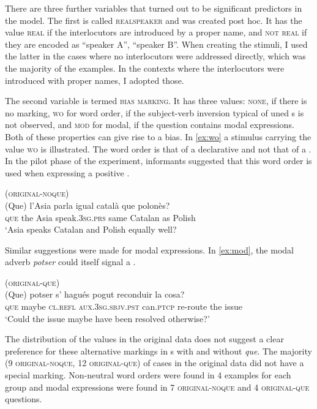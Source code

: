 There are three further variables that turned out to be significant predictors in the model. The first  is called \textsc{realspeaker} and  was created post hoc. It has the value \textsc{real} if the interlocutors are introduced by a proper name, and \textsc{not real} if they are encoded as ``speaker A'', ``speaker B''. When creating the stimuli, I used the latter  in the cases where  no interlocutors were addressed directly, which  was the majority of the examples. In the contexts where the interlocutors were introduced with proper names, I adopted those.   



The second variable is termed \textsc{bias marking}. It has three values: \textsc{none}, if there is no marking, \textsc{wo} for word order, if the subject-verb inversion typical of uned s is not observed, and \textsc{mod} for modal, if the question contains modal expressions. Both of these properties can give rise to a bias. In \eqref{ex:wo} a stimulus carrying the value \textsc{wo}  is illustrated. The word order is that of a declarative and not that of a . In the pilot phase of the experiment, informants suggested that this word order is used when expressing a positive .\largerpage[2]

\ea\label{ex:wo}
(\textsc{original-noque})\\
\gll 
(Que) l'Asia parla igual català que polonès?\\
\textsc{que} {the Asia} speak.\textsc{3sg.prs} same Catalan as Polish \\
\glt `Asia speaks Catalan and Polish equally well? 
\z

Similar suggestions were made for modal expressions. In \eqref{ex:mod}, the modal adverb \emph{potser} could itself signal a .

\ea\label{ex:mod} (\textsc{original-que})\\ \gll  (Que) potser s' hagués pogut reconduir la cosa?\\
\textsc{que} maybe \textsc{cl.refl} \textsc{aux.3sg.sbjv.pst} can.\textsc{ptcp} re-route the issue\\
\glt `Could the issue maybe have been resolved otherwise?'
\z

The distribution of the values in the original data does not suggest a clear preference for these alternative   markings in s with and without \emph{que}. The majority (9 \textsc{original-noque}, 12 \textsc{original-que}) of cases in the original data did not have a special  marking. Non-neutral word orders were found in 4 examples for each group and modal expressions were found in 7 \textsc{original-noque} and 4 \textsc{original-que} questions.

